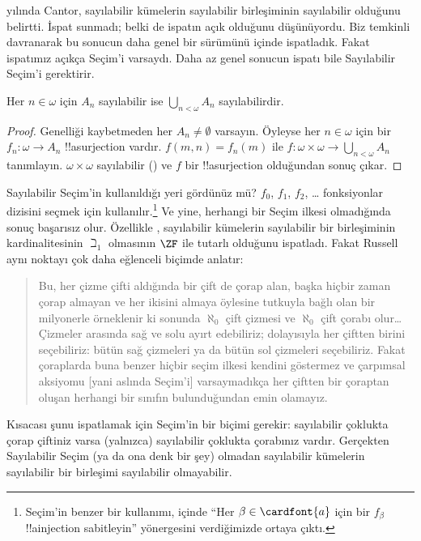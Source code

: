 \documentclass[../../../include/open-logic-section]{subfiles}
\begin{document}
\begin{ex}
\citeyear{Cantor1878} yılında Cantor, sayılabilir kümelerin sayılabilir
birleşiminin sayılabilir olduğunu belirtti. İspat sunmadı; belki de ispatın
açık olduğunu düşünüyordu. Biz temkinli davranarak bu sonucun daha genel
bir sürümünü  içinde
ispatladık. Fakat ispatımız açıkça Seçim'i varsaydı. Daha az genel sonucun
ispatı bile Sayılabilir Seçim'i gerektirir.

\begin{thm}
Her $n\in\omega$ için $A_n$ sayılabilir ise
$\bigcup_{n<\omega}A_n$ sayılabilirdir.
\end{thm}

\begin{proof}
Genelliği kaybetmeden her $A_n\neq\emptyset$ varsayın. Öyleyse her
$n\in\omega$ için bir $f_n\colon\omega\to A_n$ !!a{surjection} vardır.
$f(m,n)=f_n(m)$ ile
$f\colon\omega\times\omega\to\bigcup_{n<\omega}A_n$ tanımlayın.
$\omega\times\omega$ sayılabilir
() ve $f$ bir
!!a{surjection} olduğundan sonuç çıkar.
\end{proof}
\noindent
Sayılabilir Seçim'in kullanıldığı yeri gördünüz mü? $f_0$, $f_1$, $f_2$, \dots
fonksiyonlar dizisini seçmek için kullanılır.\footnote{Seçim'in benzer bir
kullanımı,  içinde
``Her $\beta\in\cardfont{a}$ için bir $f_\beta$ !!a{injection}
sabitleyin'' yönergesini verdiğimizde ortaya çıktı.} Ve yine, herhangi bir
Seçim ilkesi olmadığında sonuç başarısız olur. Özellikle
\citet{FefermanLevy1963}, sayılabilir kümelerin sayılabilir bir birleşiminin
kardinalitesinin $\beth_1$ olmasının $\ZF$ ile tutarlı olduğunu ispatladı.
Fakat Russell aynı noktayı çok daha eğlenceli biçimde anlatır:
\begin{quote}
  Bu, her çizme çifti aldığında bir çift de çorap alan, başka hiçbir zaman
  çorap almayan ve her ikisini almaya öylesine tutkuyla bağlı olan bir
  milyonerle örneklenir ki sonunda $\aleph_0$ çift çizmesi ve $\aleph_0$
  çift çorabı olur\dots\@ Çizmeler arasında sağ ve solu ayırt edebiliriz;
  dolayısıyla her çiftten birini seçebiliriz: bütün sağ çizmeleri ya da
  bütün sol çizmeleri seçebiliriz. Fakat çoraplarda buna benzer hiçbir
  seçim ilkesi kendini göstermez ve çarpımsal aksiyomu [yani aslında
  Seçim'i] varsaymadıkça her çiftten bir çoraptan oluşan herhangi bir
  sınıfın bulunduğundan emin olamayız.
  \citep[p.~126]{Russell1919}
\end{quote}
Kısacası şunu ispatlamak için Seçim'in bir biçimi gerekir: sayılabilir
çoklukta çorap çiftiniz varsa (yalnızca) sayılabilir çoklukta çorabınız
vardır. Gerçekten Sayılabilir Seçim (ya da ona denk bir şey) olmadan
sayılabilir kümelerin sayılabilir bir birleşimi sayılabilir olmayabilir.
\end{ex}
\end{document}
